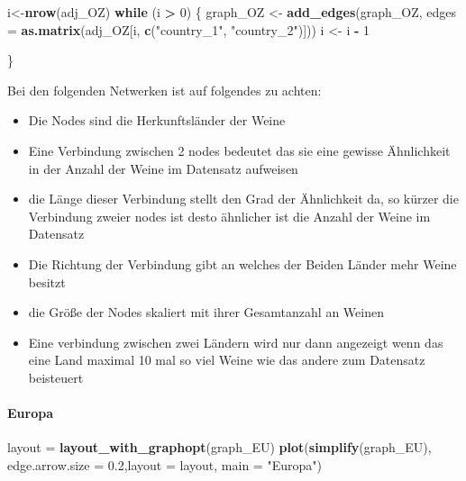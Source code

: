 \documentclass[
]{article}
\newenvironment{Shaded}{\begin{snugshade}}{\end{snugshade}}
\newcommand{\AttributeTok}[1]{\textcolor[rgb]{0.13,0.29,0.53}{#1}}
\newcommand{\ControlFlowTok}[1]{\textcolor[rgb]{0.13,0.29,0.53}{\textbf{#1}}}
\newcommand{\DecValTok}[1]{\textcolor[rgb]{0.00,0.00,0.81}{#1}}
\newcommand{\FloatTok}[1]{\textcolor[rgb]{0.00,0.00,0.81}{#1}}
\newcommand{\FunctionTok}[1]{\textcolor[rgb]{0.13,0.29,0.53}{\textbf{#1}}}
\newcommand{\NormalTok}[1]{#1}
\newcommand{\OtherTok}[1]{\textcolor[rgb]{0.56,0.35,0.01}{#1}}
\newcommand{\SpecialCharTok}[1]{\textcolor[rgb]{0.81,0.36,0.00}{\textbf{#1}}}
\newcommand{\StringTok}[1]{\textcolor[rgb]{0.31,0.60,0.02}{#1}}
\begin{document}
\begin{Shaded}
\begin{Highlighting}[]
\NormalTok{i}\OtherTok{\textless{}{-}}\FunctionTok{nrow}\NormalTok{(adj\_OZ)}
\ControlFlowTok{while}\NormalTok{ (i }\SpecialCharTok{\textgreater{}} \DecValTok{0}\NormalTok{) \{}
\NormalTok{  graph\_OZ }\OtherTok{\textless{}{-}} \FunctionTok{add\_edges}\NormalTok{(graph\_OZ, }\AttributeTok{edges =} \FunctionTok{as.matrix}\NormalTok{(adj\_OZ[i, }\FunctionTok{c}\NormalTok{(}\StringTok{"country\_1"}\NormalTok{, }\StringTok{"country\_2"}\NormalTok{)]))}
\NormalTok{  i }\OtherTok{\textless{}{-}}\NormalTok{ i }\SpecialCharTok{{-}} \DecValTok{1}
  
\NormalTok{\}}
\end{Highlighting}
\end{Shaded}

Bei den folgenden Netwerken ist auf folgendes zu achten:

\begin{itemize}
\item
  Die Nodes sind die Herkunftsländer der Weine
\item
  Eine Verbindung zwischen 2 nodes bedeutet das sie eine gewisse
  Ähnlichkeit in der Anzahl der Weine im Datensatz aufweisen
\item
  die Länge dieser Verbindung stellt den Grad der Ähnlichkeit da, so
  kürzer die Verbindung zweier nodes ist desto ähnlicher ist die Anzahl
  der Weine im Datensatz
\item
  Die Richtung der Verbindung gibt an welches der Beiden Länder mehr
  Weine besitzt
\item
  die Größe der Nodes skaliert mit ihrer Gesamtanzahl an Weinen
\item
  Eine verbindung zwischen zwei Ländern wird nur dann angezeigt wenn das
  eine Land maximal 10 mal so viel Weine wie das andere zum Datensatz
  beisteuert
\end{itemize}

\paragraph{Europa}\label{europa}

\begin{Shaded}
\begin{Highlighting}[]
\NormalTok{layout }\OtherTok{=} \FunctionTok{layout\_with\_graphopt}\NormalTok{(graph\_EU)}
\FunctionTok{plot}\NormalTok{(}\FunctionTok{simplify}\NormalTok{(graph\_EU), }\AttributeTok{edge.arrow.size =} \FloatTok{0.2}\NormalTok{,}\AttributeTok{layout =}\NormalTok{ layout, }\AttributeTok{main =} \StringTok{"Europa"}\NormalTok{)}
\end{Highlighting}
\end{Shaded}
\end{document}

